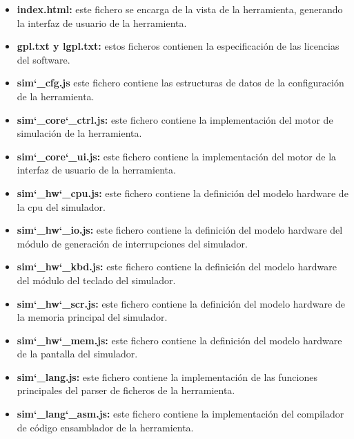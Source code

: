 \begin{itemize}

\item \textbf{index.html: } este fichero se encarga de la vista de la herramienta, generando la interfaz de usuario de la herramienta.

\item \textbf{gpl.txt y lgpl.txt: } estos ficheros contienen la especificación de las licencias del \gls{software}.

\item \textbf{sim\char`_cfg.js} este fichero contiene las estructuras de datos de la configuración de la herramienta.

\item \textbf{sim\char`_core\char`_ctrl.js:}  este fichero contiene la implementación del motor de simulación de la herramienta.

\item \textbf{sim\char`_core\char`_ui.js: } este fichero contiene la implementación del motor de la interfaz de usuario de la herramienta.

\item \textbf{sim\char`_hw\char`_cpu.js: } este fichero contiene la definición del modelo \gls{hardware} de la \acrshort{cpu} del simulador.

\item \textbf{sim\char`_hw\char`_io.js: } este fichero contiene la definición del modelo \gls{hardware} del módulo de generación de interrupciones del simulador.

\item \textbf{sim\char`_hw\char`_kbd.js: } este fichero contiene la definición del modelo \gls{hardware} del módulo del teclado del simulador.

\item \textbf{sim\char`_hw\char`_scr.js: } este fichero contiene la definición del modelo \gls{hardware} de la memoria principal del simulador.

\item \textbf{sim\char`_hw\char`_mem.js: } este fichero contiene la definición del modelo \gls{hardware} de la pantalla del simulador.

\item \textbf{sim\char`_lang.js: } este fichero contiene la implementación de las funciones principales del parser de ficheros de la herramienta.

\item \textbf{sim\char`_lang\char`_asm.js: } este fichero contiene la implementación del compilador de código \gls{ensamblador} de la herramienta.


\end{itemize}
